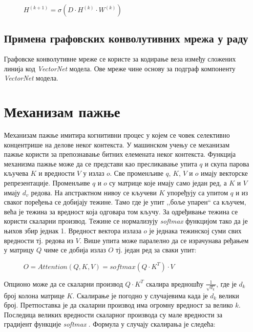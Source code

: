 \documentclass[11pt,oneside]{memoir}
\begin{document}
\begin{figure}[H]
  \centering
  $H^{(k+1)} = \sigma (D\cdot H^{(k)}\cdot W^{(k)})$
\end{figure}

\subsection{Примена графовских конволутивних мрежа у раду}

Графовске конволутивне мреже се користе за кодирање веза између сложених линија код \textit{VectorNet} \cite{vectornet} модела. Ове мреже
чине основу за подграф компоненту \textit{VectorNet} модела.

\section{Механизам пажње}

Механизам пажње имитира когнитивни процес у којем се човек селективно концентрише на делове неког контекста. У машинском учењу
се механизам пажње користи за препознавање битних елемената неког контекста. Функција механизма пажње може да се
представи као пресликавање упита $q$ и скупа парова кључева $K$ и вредности $V$ у излаз $o$. Све променљиве $q$, $K$, $V$ и $o$ имају
векторске репрезентације.
Променљиве $q$ и $o$ су матрице које имају само један ред, а $K$ и $V$ имају $d_v$ редова.
На апстрактном нивоу се кључеви $K$ упоређују са упитом $q$ и из сваког поређења се добијају тежине. Тамо где је упит ,,боље упарен`` са кључем,
већа је тежина за вредност која одговара том кључу. За одређивање тежина се користи скаларни производ. 
Тежине се нормализују \textit{softmax} функцијом тако да је њихов збир једнак 1.
Вредност вектора излаза $o$ је једнака тежинској суми свих вредности тј. редова из $V$. Више упита може паралелно да се израчунава ређањем
у матрицу $Q$ чиме се добија излаз $O$ тј. један ред за сваки упит:

\begin{figure}[H]
  \centering
  $O = Attention(Q, K, V) = softmax(Q\cdot K^T)\cdot V$
\end{figure}

Опционо може да се скаларни производ $Q\cdot K^T$ скалира вредношћу $\frac{1}{\sqrt{d_k}}$, где је $d_k$ број колона матрице $K$. Скалирање је погодно
у случајевима када је $d_k$ велики број. Претпоставка је да скаларни производ има огромну вредност за велико $k$. Последица великих вредности 
скаларног производа су мале вредности за градијент функције \textit{softmax} \cite{attention_is_all_you_need}. Формула у случају скалирања је следећа:
\end{document}
